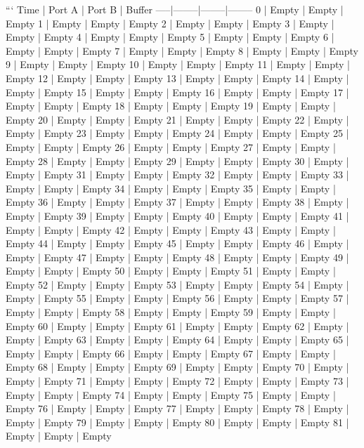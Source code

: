 ```
Time | Port A | Port B | Buffer
-----|--------|--------|--------
0    | Empty  | Empty  | Empty
1    | Empty  | Empty  | Empty
2    | Empty  | Empty  | Empty
3    | Empty  | Empty  | Empty
4    | Empty  | Empty  | Empty
5    | Empty  | Empty  | Empty
6    | Empty  | Empty  | Empty
7    | Empty  | Empty  | Empty
8    | Empty  | Empty  | Empty
9    | Empty  | Empty  | Empty
10   | Empty  | Empty  | Empty
11   | Empty  | Empty  | Empty
12   | Empty  | Empty  | Empty
13   | Empty  | Empty  | Empty
14   | Empty  | Empty  | Empty
15   | Empty  | Empty  | Empty
16   | Empty  | Empty  | Empty
17   | Empty  | Empty  | Empty
18   | Empty  | Empty  | Empty
19   | Empty  | Empty  | Empty
20   | Empty  | Empty  | Empty
21   | Empty  | Empty  | Empty
22   | Empty  | Empty  | Empty
23   | Empty  | Empty  | Empty
24   | Empty  | Empty  | Empty
25   | Empty  | Empty  | Empty
26   | Empty  | Empty  | Empty
27   | Empty  | Empty  | Empty
28   | Empty  | Empty  | Empty
29   | Empty  | Empty  | Empty
30   | Empty  | Empty  | Empty
31   | Empty  | Empty  | Empty
32   | Empty  | Empty  | Empty
33   | Empty  | Empty  | Empty
34   | Empty  | Empty  | Empty
35   | Empty  | Empty  | Empty
36   | Empty  | Empty  | Empty
37   | Empty  | Empty  | Empty
38   | Empty  | Empty  | Empty
39   | Empty  | Empty  | Empty
40   | Empty  | Empty  | Empty
41   | Empty  | Empty  | Empty
42   | Empty  | Empty  | Empty
43   | Empty  | Empty  | Empty
44   | Empty  | Empty  | Empty
45   | Empty  | Empty  | Empty
46   | Empty  | Empty  | Empty
47   | Empty  | Empty  | Empty
48   | Empty  | Empty  | Empty
49   | Empty  | Empty  | Empty
50   | Empty  | Empty  | Empty
51   | Empty  | Empty  | Empty
52   | Empty  | Empty  | Empty
53   | Empty  | Empty  | Empty
54   | Empty  | Empty  | Empty
55   | Empty  | Empty  | Empty
56   | Empty  | Empty  | Empty
57   | Empty  | Empty  | Empty
58   | Empty  | Empty  | Empty
59   | Empty  | Empty  | Empty
60   | Empty  | Empty  | Empty
61   | Empty  | Empty  | Empty
62   | Empty  | Empty  | Empty
63   | Empty  | Empty  | Empty
64   | Empty  | Empty  | Empty
65   | Empty  | Empty  | Empty
66   | Empty  | Empty  | Empty
67   | Empty  | Empty  | Empty
68   | Empty  | Empty  | Empty
69   | Empty  | Empty  | Empty
70   | Empty  | Empty  | Empty
71   | Empty  | Empty  | Empty
72   | Empty  | Empty  | Empty
73   | Empty  | Empty  | Empty
74   | Empty  | Empty  | Empty
75   | Empty  | Empty  | Empty
76   | Empty  | Empty  | Empty
77   | Empty  | Empty  | Empty
78   | Empty  | Empty  | Empty
79   | Empty  | Empty  | Empty
80   | Empty  | Empty  | Empty
81   | Empty  | Empty  | Empty
